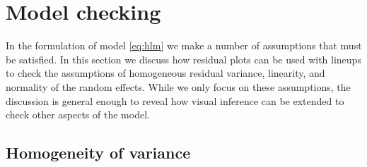 \documentclass[12pt]{article}
\begin{document}


\section{Model checking}\label{sec:checking}

In the formulation of model \eqref{eq:hlm} we make a number of assumptions that must be satisfied. In this section we discuss how residual plots can be used with lineups to check the assumptions of homogeneous residual variance, linearity, and normality of the random effects. While we only focus on these assumptions, the discussion is general enough to reveal how visual inference can be extended to check other aspects of the model.

%


\subsection{Homogeneity of variance}\label{sec:homogeneity}
\end{document}
